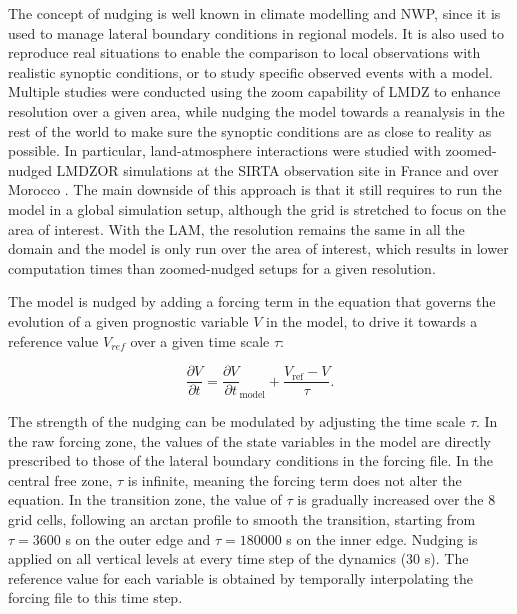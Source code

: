 The concept of nudging is well known in climate modelling and NWP, since it is used to manage lateral boundary conditions in regional models. It is also used to reproduce real situations to enable the comparison to local observations with realistic synoptic conditions, or to study specific observed events with a model. 
Multiple studies were conducted using the zoom capability of LMDZ to enhance resolution over a given area, while nudging the model towards a reanalysis in the rest of the world to make sure the synoptic conditions are as close to reality as possible. In particular, land-atmosphere interactions were studied with zoomed-nudged LMDZOR simulations at the SIRTA observation site in France \citep{cheruy_combined_2013, campoy_response_2013} and over Morocco \citep{balhane_towards_2024, arjdal_modeling_2024}.
The main downside of this approach is that it still requires to run the model in a global simulation setup, although the grid is stretched to focus on the area of interest. With the LAM, the resolution remains the same in all the domain and the model is only run over the area of interest, which results in lower computation times than zoomed-nudged setups for a given resolution.

The model is nudged by adding a forcing term in the equation that governs the evolution of a given prognostic variable $V$ in the model, to drive it towards a reference value $V_{ref}$ over a given time scale $\tau$:

\begin{equation}
    \frac{\partial V}{\partial t} = \frac{\partial V}{\partial t}_{\text{model}}+ \frac{V_{\text{ref}} - V}{\tau}.
\end{equation}

The strength of the nudging can be modulated by adjusting the time scale $\tau$.
In the raw forcing zone, the values of the state variables in the model are directly prescribed to those of the lateral boundary conditions in the forcing file. 
In the central free zone, $\tau$ is infinite, meaning the forcing term does not alter the equation. 
In the transition zone, the value of $\tau$ is gradually increased over the 8 grid cells, following an arctan profile to smooth the transition, starting from $\tau = 3600$ s on the outer edge and $\tau = 180000$ s on the inner edge.
Nudging is applied on all vertical levels at every time step of the dynamics (30 s). The reference value for each variable is obtained by temporally interpolating the forcing file to this time step. 

